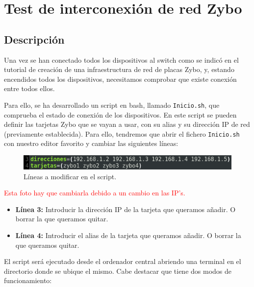 \section{Test de interconexión de red Zybo}
\subsection{Descripción}
Una vez se han conectado todos los dispositivos al switch como se indicó en el tutorial de creación de una infraestructura de red de placas Zybo, y, estando encendidos todos los dispositivos, necesitamos comprobar que existe conexión entre todos ellos.

Para ello, se ha desarrollado un script en bash, llamado \texttt{Inicio.sh}, que comprueba el estado de conexión de los dispositivos. En este script se pueden definir las tarjetas Zybo que se vayan a usar, con su alias y su dirección IP de red (previamente establecida). Para ello, tendremos que abrir el fichero \texttt{Inicio.sh} con nuestro editor favorito y cambiar las siguientes líneas:
\begin{figure}[h]
	\centering
	\includegraphics[scale=0.7]{Anexos/Anexo2/Test/Script.png}
	\caption{Líneas a modificar en el script.}
	\label{Líneas a modificar en el script}
\end{figure}

\textcolor{red}{Esta foto hay que cambiarla debido a un cambio en las IP's.}
\begin{itemize}
	\item \textbf{Línea 3:} Introducir la dirección IP de la tarjeta que queramos añadir. O borrar la que queramos quitar.
	\item \textbf{Línea 4:} Introducir el alias de la tarjeta que queramos añadir. O borrar la que queramos quitar.
\end{itemize}

El script será ejecutado desde el ordenador central abriendo una terminal en el directorio donde se ubique el mismo. Cabe destacar que tiene dos modos de funcionamiento:

